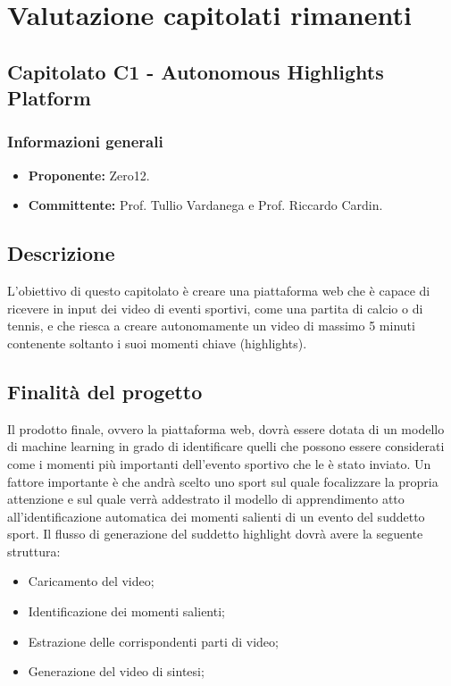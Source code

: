 \documentclass{article}
\begin{document}
\section{Valutazione capitolati rimanenti}
    \subsection{Capitolato C1 - Autonomous Highlights Platform}
       \subsubsection{Informazioni generali}
       \begin{itemize}
           \item \textbf{Proponente: }Zero12.
           \item \textbf{Committente: }Prof. Tullio Vardanega e Prof. Riccardo Cardin.
       \end{itemize}

    \subsection{Descrizione}
        L'obiettivo di questo capitolato è creare una piattaforma web che è capace di ricevere in input dei video di eventi sportivi, come una partita di calcio o di tennis, e che riesca a creare autonomamente un video di massimo 5 minuti contenente soltanto i suoi momenti chiave (highlights). 
    
    \subsection{Finalità del progetto}
        Il prodotto finale, ovvero la piattaforma web, dovrà essere dotata di un modello di machine learning in grado di identificare quelli che possono essere considerati come i momenti più importanti dell'evento sportivo che le è stato inviato. Un fattore importante è che andrà scelto uno sport sul quale focalizzare la propria attenzione e sul quale verrà addestrato il modello di apprendimento atto all'identificazione automatica dei momenti salienti di un evento del suddetto sport.  
        Il flusso di generazione del suddetto highlight dovrà avere la seguente struttura:
        \begin{itemize}
            \item Caricamento del video; 
            \item Identificazione dei momenti salienti;
            \item Estrazione delle corrispondenti parti di video;
            \item Generazione del video di sintesi;
        \end{itemize}
\end{document}
